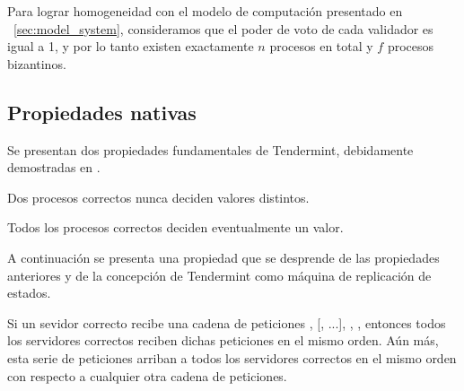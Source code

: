 Para lograr homogeneidad con el modelo de computación presentado en ~\ref{sec:model_system},
consideramos que el poder de voto de cada validador es igual a 1, y por lo tanto existen exactamente
$n$ procesos en total y $f$ procesos bizantinos.
 
\subsection{Propiedades nativas}
Se presentan dos propiedades fundamentales de Tendermint, debidamente demostradas en \cite{Buchman.2018.Tendermint}.

\setcounter{prop:tendermint}{\value{property}}

\begin{property}\label{tendermint:agreement}
  Dos procesos correctos nunca deciden valores distintos.
\end{property}

\begin{property}\label{tendermint:termination}
    Todos los procesos correctos deciden eventualmente un valor.
\end{property}

A continuación se presenta una propiedad que se desprende de las propiedades anteriores
y de la concepción de Tendermint
como máquina de replicación de estados.

\begin{property}\label{tendermint:global-delivery}
  Si un sevidor correcto recibe una cadena de peticiones
  \BeginBlock, [\DeliverTx, ...], \EndBlock, \Commit,
  entonces todos los servidores correctos reciben dichas peticiones en el mismo orden.
  Aún más, esta serie de peticiones arriban a todos los servidores correctos en
  el mismo orden con respecto a cualquier otra cadena de peticiones.
\end{property}



